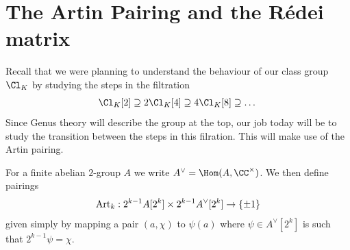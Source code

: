 \documentclass{lecturenotes}
\newcommand{\Art}{\operatorname{Art}}
\numberwithin{equation}{section}
\begin{document}
\section{The Artin Pairing and the R\'edei matrix}
Recall that we were planning to understand the behaviour of our class group $\Cl_K$ by studying the steps in the filtration
\[\Cl_K[2]\supseteq2\Cl_K[4]\supseteq4\Cl_K[8]\supseteq\dots\]
Since Genus theory will describe the group at the top, our job today will be to study the transition between the steps in this filration.  This will make use of the Artin pairing.
\begin{definition}
    For a finite abelian $2$-group $A$ we write $A^\vee=\Hom(A,\CC^\times)$.  We then define pairings
    \[\Art_{k}:2^{k-1}A[2^k]\times 2^{k-1}A^\vee[2^k]\to \set{\pm 1}\]
    given simply by mapping a pair $(a,\chi)$ to $\psi(a)$ where $\psi\in A^\vee[2^k]$ is such that $2^{k-1}\psi=\chi$.
\end{definition}
\end{document}
